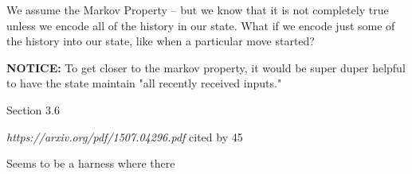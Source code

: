 We assume the Markov Property -- but we know that it is not completely true unless we encode all of the history in our state.
What if we encode just some of the history into our state, like when a particular move started?

\textbf{NOTICE:}
To get closer to the markov property, it would be super duper helpful to have the state maintain "all recently received inputs."

Section 3.6


\textit{https://arxiv.org/pdf/1507.04296.pdf}
cited by 45

Seems to be a harness where there 
